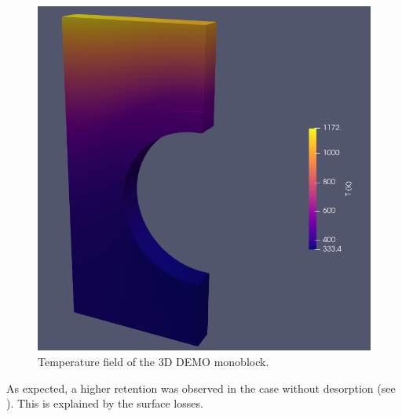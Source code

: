 \begin{figure} [h]
    \centering
    \includegraphics[width=\linewidth]{Figures/Chapter3/monoblocks/3D_monoblocks/temperature_3D_monoblock.png}
    \caption{Temperature field of the 3D DEMO monoblock.}
\end{figure}


As expected, a higher retention was observed in the case without desorption (see ).
This is explained by the surface losses.

